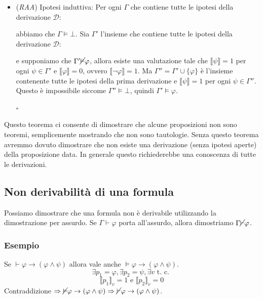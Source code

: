 \documentclass[a4paper,12pt]{report}
\newcommand\val[1]{\llbracket#1\rrbracket}
\newcommand\qed{\begin{flushright}{$\square$}\end{flushright}}
\begin{document}
\begin{itemize}
\item (\emph{RAA}) Ipotesi induttiva: Per ogni $\Gamma$ che contiene tutte le ipotesi della derivazione  $\mathcal{D}$:
\begin{center}
\end{center}
abbiamo che $\Gamma \vDash \bot$. Sia $\Gamma'$ l'insieme che contiene tutte le ipotesi della derivazione $\mathcal{D}$:
\begin{center}
\end{center}
e supponiamo che $\Gamma' \cancel{\vDash} \varphi$, allora esiste una valutazione tale che $\val{\psi} = 1$ per ogni $\psi \in \Gamma'$ e 
$\val{\varphi} = 0$, ovvero $\val{\neg\varphi} = 1$. Ma $\Gamma'' = \Gamma' \cup \{\varphi\}$ \`{e} l'insieme contenente tutte le ipotesi della prima derivazione e $\val{\psi} = 1$ per ogni $\psi \in \Gamma''$. Questo \`{e} impossibile siccome $\Gamma'' \vDash \bot$, quindi $\Gamma' \vDash \varphi$.
\qed
\end{itemize}

Questo teorema ci consente di dimostrare che alcune proposizioni non sono teoremi, semplicemente mostrando che non sono tautologie. Senza questo teorema avremmo dovuto dimostrare che non esiste una derivazione (senza ipotesi aperte) della proposizione data. In generale questo richiederebbe una conoscenza di tutte le derivazioni.

\subsection{Non derivabilit\`{a} di una formula}
Possiamo dimostrare che una formula non \`{e} derivabile utilizzando la dimostrazione per assurdo. 
Se $\Gamma \vdash \varphi$ porta all'assurdo, allora dimostriamo $\Gamma \cancel{\vdash} \varphi$.
\subsubsection{Esempio}
Se $\vdash \varphi \to (\varphi \wedge \psi)$ allora vale anche $\vDash \varphi \to (\varphi \wedge \psi)$.
\[ \exists p_1 = \varphi, \exists p_2 = \psi, \exists v \text{ t. c. }\]
\[ \val{p_1}_v = 1 \text{ e } \val{p_2}_v = 0\]
Contraddizione $\Rightarrow \cancel{\vDash} \varphi \to (\varphi \wedge \psi) \Rightarrow \cancel{\vdash} \varphi \to (\varphi \wedge \psi)$.
\end{document}
